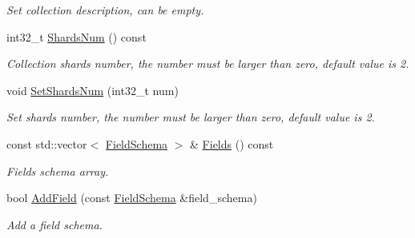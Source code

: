 \begin{DoxyCompactItemize}
\begin{DoxyCompactList}\small\item\em Set collection description, can be empty. \end{DoxyCompactList}\item 
\mbox{\label{classmilvus_1_1_collection_schema_a1b9ea81c13f83282a135dda3a8461eb4}} 
int32\+\_\+t \hyperlink{classmilvus_1_1_collection_schema_a1b9ea81c13f83282a135dda3a8461eb4}{Shards\+Num} () const
\begin{DoxyCompactList}\small\item\em Collection shards number, the number must be larger than zero, default value is 2. \end{DoxyCompactList}\item 
\mbox{\label{classmilvus_1_1_collection_schema_af14377075e0cf7f247c304db391395cb}} 
void \hyperlink{classmilvus_1_1_collection_schema_af14377075e0cf7f247c304db391395cb}{Set\+Shards\+Num} (int32\+\_\+t num)
\begin{DoxyCompactList}\small\item\em Set shards number, the number must be larger than zero, default value is 2. \end{DoxyCompactList}\item 
\mbox{\label{classmilvus_1_1_collection_schema_ae589903c587b07827eb6a13725883077}} 
const std\+::vector$<$ \hyperlink{classmilvus_1_1_field_schema}{Field\+Schema} $>$ \& \hyperlink{classmilvus_1_1_collection_schema_ae589903c587b07827eb6a13725883077}{Fields} () const
\begin{DoxyCompactList}\small\item\em Fields schema array. \end{DoxyCompactList}\item 
\mbox{\label{classmilvus_1_1_collection_schema_ac9678b123654fbc07d9c4f1d8698bb1f}} 
bool \hyperlink{classmilvus_1_1_collection_schema_ac9678b123654fbc07d9c4f1d8698bb1f}{Add\+Field} (const \hyperlink{classmilvus_1_1_field_schema}{Field\+Schema} \&field\+\_\+schema)
\begin{DoxyCompactList}\small\item\em Add a field schema. \end{DoxyCompactList}\item 

\end{DoxyCompactItemize}
